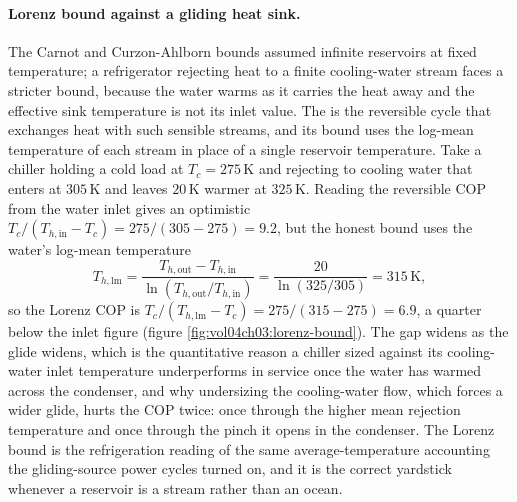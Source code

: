 \paragraph{Lorenz bound against a gliding heat sink.} The Carnot and Curzon-Ahlborn
bounds assumed infinite reservoirs at fixed temperature; a refrigerator rejecting
heat to a finite cooling-water stream faces a stricter bound, because the water
warms as it carries the heat away and the effective sink temperature is not its
inlet value. The  is the reversible cycle that exchanges heat
with such sensible streams, and its bound uses the log-mean temperature of each
stream in place of a single reservoir temperature. Take a chiller holding a cold
load at $T_c = 275\,\si{\kelvin}$ and rejecting to cooling water that enters at
$305\,\si{\kelvin}$ and leaves $20\,\si{\kelvin}$ warmer at $325\,\si{\kelvin}$.
Reading the reversible COP from the water inlet gives an optimistic
$T_c/(T_{h,\text{in}} - T_c) = 275/(305 - 275) = 9.2$, but the honest bound uses
the water's log-mean temperature
\[
T_{h,\text{lm}} = \frac{T_{h,\text{out}} - T_{h,\text{in}}}
{\ln(T_{h,\text{out}}/T_{h,\text{in}})}
= \frac{20}{\ln(325/305)} = 315\,\si{\kelvin},
\]
so the Lorenz COP is $T_c/(T_{h,\text{lm}} - T_c) = 275/(315 - 275) = 6.9$, a
quarter below the inlet figure (figure \ref{fig:vol04ch03:lorenz-bound}). The gap
widens as the glide widens, which is the quantitative reason a chiller sized against
its cooling-water inlet temperature underperforms in service once the water has
warmed across the condenser, and why undersizing the cooling-water flow, which
forces a wider glide, hurts the COP twice: once through the higher mean rejection
temperature and once through the pinch it opens in the condenser. The Lorenz bound
is the refrigeration reading of the same average-temperature accounting the
gliding-source power cycles turned on, and it is the correct yardstick whenever a
reservoir is a stream rather than an ocean.



